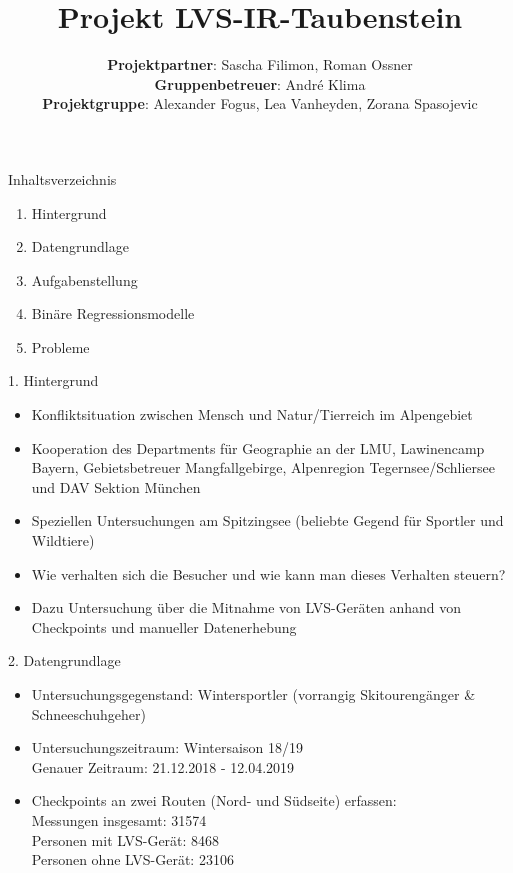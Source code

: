 \documentclass{beamer}
\title{Projekt LVS-IR-Taubenstein}
\author{\small \textbf{Projektpartner}: Sascha Filimon, Roman Ossner\\ \textbf{Gruppenbetreuer}: Andr\'{e} Klima\\ 
\textbf{Projektgruppe}: Alexander Fogus, Lea Vanheyden, Zorana Spasojevic
}
\institute{Ludwig Maximilians Universität}
\begin{document}
\begin{frame}
\titlepage
\end{frame}

\begin{frame}[t]{Inhaltsverzeichnis}
\begin{enumerate}
    \item Hintergrund
    \item Datengrundlage
    \item Aufgabenstellung
    \item Binäre Regressionsmodelle
    \item Probleme
\end{enumerate}   
\end{frame}

 
\begin{frame}[t]{1. Hintergrund}\vspace{4pt}
\begin{itemize}
	\item Konﬂiktsituation zwischen Mensch und Natur/Tierreich im Alpengebiet 
	\item Kooperation des Departments für Geographie an der LMU, Lawinencamp Bayern, Gebietsbetreuer Mangfallgebirge, Alpenregion Tegernsee/Schliersee und DAV Sektion München
	\item  Speziellen Untersuchungen am Spitzingsee (beliebte Gegend für Sportler und Wildtiere) 
	\item Wie verhalten sich die Besucher und wie kann man dieses Verhalten steuern? 
	\item Dazu Untersuchung über die Mitnahme von LVS-Geräten anhand von Checkpoints und manueller Datenerhebung
\end{itemize}
\end{frame}

\begin{frame}[t]{2. Datengrundlage}\vspace{4pt}
\vspace{1pt}
\begin{itemize}
	\item Untersuchungsgegenstand: Wintersportler (vorrangig Skitourengänger \& Schneeschuhgeher) 
	\item Untersuchungszeitraum: Wintersaison 18/19 \\
	 Genauer Zeitraum: 21.12.2018 - 12.04.2019
	\item Checkpoints an zwei Routen (Nord- und Südseite) erfassen: \\
	 Messungen insgesamt: 31574 \\
	 Personen mit LVS-Gerät: 8468 \\
	 Personen ohne LVS-Gerät: 23106
\end{itemize}	
\end{frame}
\end{document}
